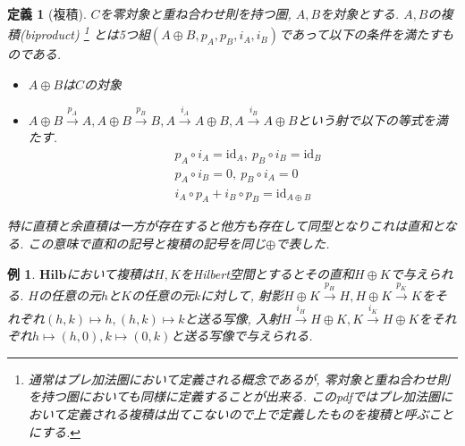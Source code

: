 \documentclass[a4paper,12pt]{ltjsarticle}
\theoremstyle{break}
\newtheorem{defn}[thm]{定義}
\newtheorem{eg}[thm]{例}
\newcommand{\hilb}{\mathbf{Hilb}}
\newcommand{\xr}[1]{\xrightarrow{#1}}
\newcommand{\id}{\mathrm{id}}
\newcommand{\ci}{\circ}
\newcommand{\opl}{\oplus}
\numberwithin{equation}{section}
\begin{document}
\begin{defn}[複積]
  $C$を零対象と重ね合わせ則を持つ圏, $A,B$を対象とする. 
  $A,B$の複積(biproduct)
  \footnote{
    通常はプレ加法圏において定義される概念であるが, 零対象と重ね合わせ則を持つ圏においても同様に定義することが出来る.
    このpdfではプレ加法圏において定義される複積は出てこないので上で定義したものを複積と呼ぶことにする.  
  }
  とは5つ組$(A \opl B, p_A,p_B,i_A,i_B)$であって以下の条件を満たすものである. 
  \begin{itemize}
    \item $A \opl B$は$C$の対象
    \item $A \opl B \xr{p_A} A, A \opl B \xr{p_B} B, A \xr{i_A} A \opl B, A \xr{i_B} A \opl B$という射で以下の等式を満たす. 
    \begin{align*}
      &p_A \ci i_A = \id_A, ~ p_B \ci i_B = \id_B \\
      &p_A \ci i_B = 0, ~ p_B \ci i_A = 0 \\
      &i_A \ci p_A + i_B \ci p_B = \id_{A \opl B} 
    \end{align*}
  \end{itemize}
  特に直積と余直積は一方が存在すると他方も存在して同型となりこれは直和となる. 
  この意味で直和の記号と複積の記号を同じ$\opl$で表した. 
\end{defn}

\begin{eg}
  $\hilb$において複積は$H,K$をHilbert空間とするとその直和$H \opl K$で与えられる. 
  $H$の任意の元$h$と$K$の任意の元$k$に対して, 射影$H \opl K \xr{p_H} H, H \opl K \xr{p_K} K$をそれぞれ$(h,k) \mapsto h, (h,k) \mapsto k$と送る写像, 入射$H \xr{i_H} H \opl K, K \xr{i_K} H \opl K$をそれぞれ$h \mapsto (h,0), k \mapsto (0,k)$と送る写像で与えられる. 
\end{eg}
\end{document}
